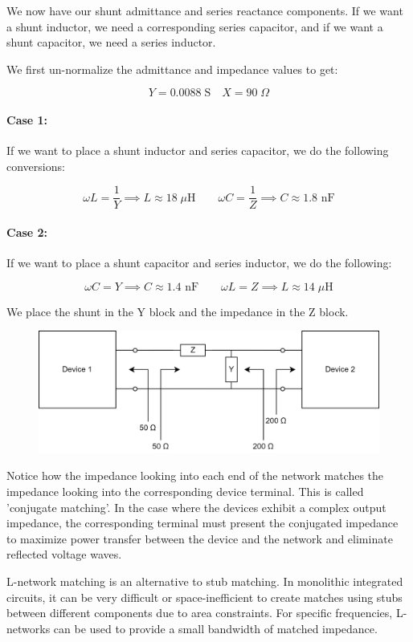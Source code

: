 \documentclass{article}
\begin{document}
We now have our shunt admittance and series reactance components. If we want a shunt inductor, we need a corresponding series capacitor, and if we want a shunt capacitor, we need a series inductor. 
\vspace{3mm}

We first un-normalize the admittance and impedance values to get:

\[
Y = 0.0088 \;\text{S} \quad X = 90 \;\Omega
\]

\paragraph{Case 1:} 

If we want to place a shunt inductor and series capacitor, we do the following conversions:

\[
\omega L = \frac{1}{Y} \implies L \approx 18 \;\mu\text{H} \qquad
\omega C = \frac{1}{Z} \implies C \approx 1.8 \text{ nF}
\]

\paragraph{Case 2:}

If we want to place a shunt capacitor and series inductor, we do the following:

\[
\omega C = Y \implies C \approx 1.4 \text{ nF}\qquad
\omega L = Z \implies L \approx 14 \;\mu\text{H} 
\]

We place the shunt in the Y block and the impedance in the Z block. 
\vspace{3mm}

\begin{figure}[ht!]
\begin{center}
    \includegraphics[width=0.7\linewidth]{figures/device.png}
\end{center}
\end{figure}

Notice how the impedance looking into each end of the network matches the impedance looking into the corresponding device terminal. This is called 'conjugate matching'. In the case where the devices exhibit a complex output impedance, the corresponding terminal must present the conjugated impedance to maximize power transfer between the device and the network and eliminate reflected voltage waves.
\vspace{3mm}

L-network matching is an alternative to stub matching. In monolithic integrated circuits, it can be very difficult or space-inefficient to create matches using stubs between different components due to area constraints. For specific frequencies, L-networks can be used to provide a small bandwidth of matched impedance. 
\end{document}
